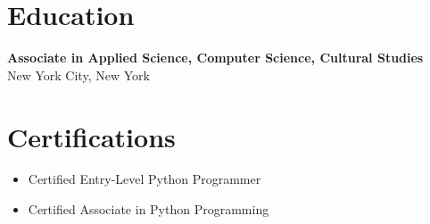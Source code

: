 \documentclass[letterpaper, 10pt]{article}
\begin{document}
\section{Education}
\textbf{Associate in Applied Science, Computer Science, Cultural Studies} \\
New York City, New York

\section{Certifications}
\begin{itemize}[leftmargin=*, nosep]
    \item Certified Entry-Level Python Programmer
    \item Certified Associate in Python Programming
\end{itemize}
\end{document}
